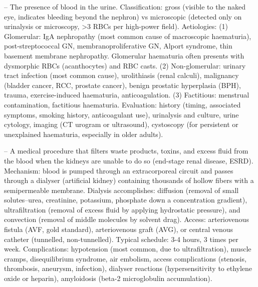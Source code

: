 -- The presence of blood in the urine. Classification: gross (visible to the naked eye, indicates bleeding beyond the nephron) vs microscopic (detected only on urinalysis or microscopy, >3 RBCs per high-power field). Aetiologies: (1) Glomerular: IgA nephropathy (most common cause of macroscopic haematuria), post-streptococcal GN, membranoproliferative GN, Alport syndrome, thin basement membrane nephropathy. Glomerular haematuria often presents with dysmorphic RBCs (acanthocytes) and RBC casts. (2) Non-glomerular: urinary tract infection (most common cause), urolithiasis (renal calculi), malignancy (bladder cancer, RCC, prostate cancer), benign prostatic hyperplasia (BPH), trauma, exercise-induced haematuria, anticoagulation. (3) Factitious: menstrual contamination, factitious haematuria. Evaluation: history (timing, associated symptoms, smoking history, anticoagulant use), urinalysis and culture, urine cytology, imaging (CT urogram or ultrasound), cystoscopy (for persistent or unexplained haematuria, especially in older adults).

-- A medical procedure that filters waste products, toxins, and excess fluid from the blood when the kidneys are unable to do so (end-stage renal disease, ESRD). Mechanism: blood is pumped through an extracorporeal circuit and passes through a dialyser (artificial kidney) containing thousands of hollow fibers with a semipermeable membrane. Dialysis accomplishes: diffusion (removal of small solutes--urea, creatinine, potassium, phosphate down a concentration gradient), ultrafiltration (removal of excess fluid by applying hydrostatic pressure), and convection (removal of middle molecules by solvent drag). Access: arteriovenous fistula (AVF, gold standard), arteriovenous graft (AVG), or central venous catheter (tunnelled, non-tunnelled). Typical schedule: 3-4 hours, 3 times per week. Complications: hypotension (most common, due to ultrafiltration), muscle cramps, disequilibrium syndrome, air embolism, access complications (stenosis, thrombosis, aneurysm, infection), dialyser reactions (hypersensitivity to ethylene oxide or heparin), amyloidosis (beta-2 microglobulin accumulation).

